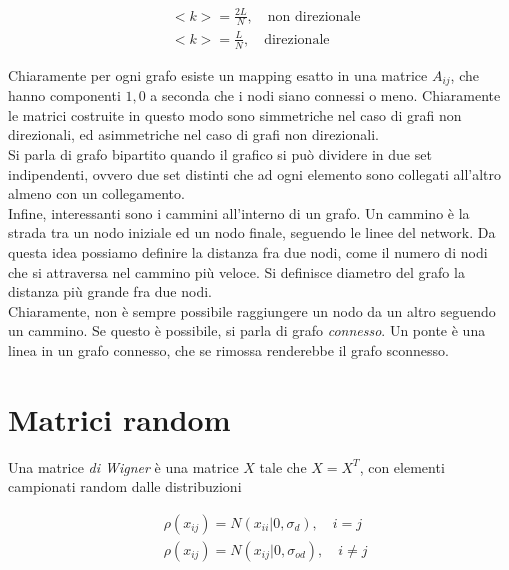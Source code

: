 \documentclass{report}
\begin{document}
\begin{align}
    &<k> = \frac{2L}{N}, \quad \text{non direzionale} \\
    &<k> = \frac{L}{N}, \quad \text{direzionale}
\end{align}

Chiaramente per ogni grafo esiste un mapping esatto in una matrice \(A_{ij}\), che hanno componenti \(1, 0\) a seconda che i nodi siano connessi o meno. Chiaramente le matrici costruite in questo modo sono simmetriche nel caso di grafi non direzionali, ed asimmetriche nel caso di grafi non direzionali. \\

Si parla di grafo bipartito quando il grafico si può dividere in due set indipendenti, ovvero due set distinti che ad ogni elemento sono collegati all'altro almeno con un collegamento. \\

Infine, interessanti sono i cammini all'interno di un grafo. Un cammino è la strada tra un nodo iniziale ed un nodo finale, seguendo le linee del network. Da questa idea possiamo definire la distanza fra due nodi, come il numero di nodi che si attraversa nel cammino più veloce. Si definisce diametro del grafo la distanza più grande fra due nodi. \\

Chiaramente, non è sempre possibile raggiungere un nodo da un altro seguendo un cammino. Se questo è possibile, si parla di grafo \emph{connesso}. Un ponte è una linea in un grafo connesso, che se rimossa renderebbe il grafo sconnesso. 


















\chapter{Matrici random}

Una matrice \emph{di Wigner} è una matrice \(X\) tale che \(X = X^T\), con elementi campionati random dalle distribuzioni 

\begin{align}
    &\rho(x_{ij}) = N(x_{ii}| 0, \sigma_d), \quad i=j \\
    &\rho(x_{ij}) = N(x_{ij}| 0, \sigma_{od}), \quad i \neq j
\end{align}
\end{document}
